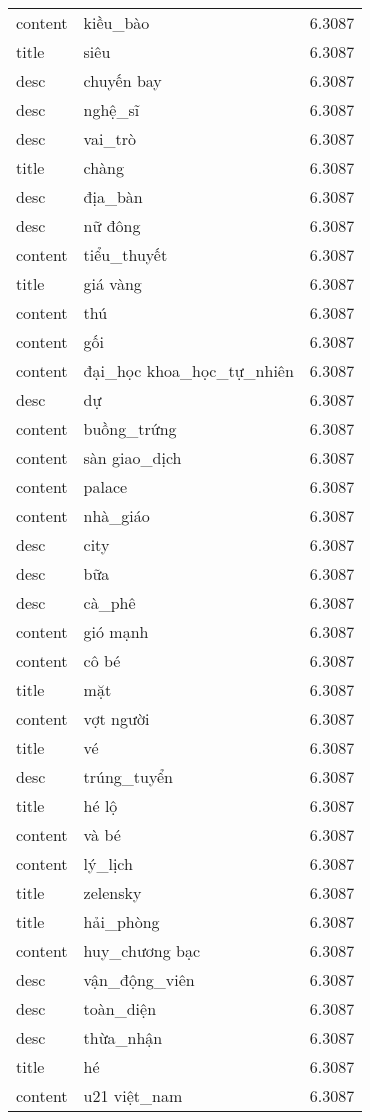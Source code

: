 \documentclass{article}
\begin{document}
\begin{tabular}{lll}
content & kiều\_bào & 6.3087\\
title & siêu & 6.3087\\
desc & chuyến bay & 6.3087\\
desc & nghệ\_sĩ & 6.3087\\
desc & vai\_trò & 6.3087\\
title & chàng & 6.3087\\
desc & địa\_bàn & 6.3087\\
desc & nữ đông & 6.3087\\
content & tiểu\_thuyết & 6.3087\\
title & giá vàng & 6.3087\\
content & thú & 6.3087\\
content & gối & 6.3087\\
content & đại\_học khoa\_học\_tự\_nhiên & 6.3087\\
desc & dự & 6.3087\\
content & buồng\_trứng & 6.3087\\
content & sàn giao\_dịch & 6.3087\\
content & palace & 6.3087\\
content & nhà\_giáo & 6.3087\\
desc & city & 6.3087\\
desc & bữa & 6.3087\\
desc & cà\_phê & 6.3087\\
content & gió mạnh & 6.3087\\
content & cô bé & 6.3087\\
title & mặt & 6.3087\\
content & vợt người & 6.3087\\
title & vé & 6.3087\\
desc & trúng\_tuyển & 6.3087\\
title & hé lộ & 6.3087\\
content & và bé & 6.3087\\
content & lý\_lịch & 6.3087\\
title & zelensky & 6.3087\\
title & hải\_phòng & 6.3087\\
content & huy\_chương bạc & 6.3087\\
desc & vận\_động\_viên & 6.3087\\
desc & toàn\_diện & 6.3087\\
desc & thừa\_nhận & 6.3087\\
title & hé & 6.3087\\
content & u21 việt\_nam & 6.3087\\

\end{tabular}
\end{document}
